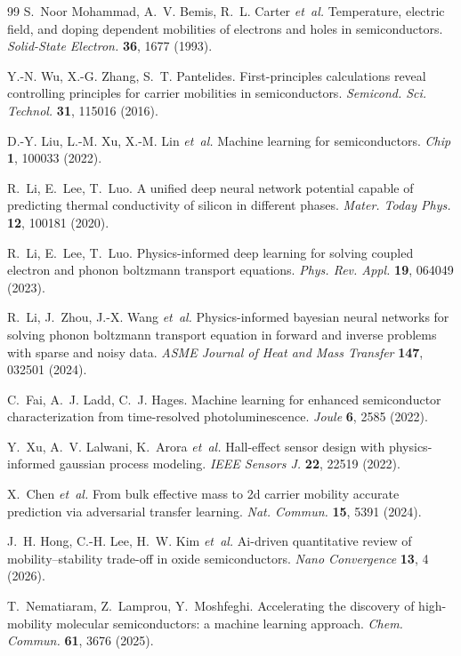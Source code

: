 \documentclass[fleqn,twoside,twocolumn,nofootinbib,showkeys]{revtex4} %
\begin{document}
\begin{thebibliography}{99}
S.~Noor Mohammad, A.~V. Bemis, R.~L. Carter \textit{et~al.} Temperature, electric field, and doping dependent mobilities of electrons and holes in semiconductors. \textit{Solid-State Electron.} \textbf{36}, 1677 (1993).

Y.-N. Wu, X.-G. Zhang, S.~T. Pantelides. First-principles calculations reveal controlling principles for carrier mobilities in semiconductors. \textit{Semicond. Sci. Technol.} \textbf{31}, 115016 (2016).

D.-Y. Liu, L.-M. Xu, X.-M. Lin \textit{et~al.} Machine learning for semiconductors. \textit{Chip} \textbf{1}, 100033 (2022).

R.~Li, E.~Lee, T.~Luo. A unified deep neural network potential capable of predicting thermal conductivity of silicon in different phases. \textit{Mater. Today Phys.} \textbf{12}, 100181 (2020).

R.~Li, E.~Lee, T.~Luo. Physics-informed deep learning for solving coupled electron and phonon boltzmann transport equations. \textit{Phys. Rev. Appl.} \textbf{19}, 064049 (2023).

R.~Li, J.~Zhou, J.-X. Wang \textit{et~al.} Physics-informed bayesian neural networks for solving phonon boltzmann transport equation in forward and inverse problems with sparse and noisy data. \textit{ASME Journal of Heat and Mass Transfer} \textbf{147}, 032501 (2024).

C.~Fai, A.~J. Ladd, C.~J. Hages. Machine learning for enhanced semiconductor characterization from time-resolved photoluminescence. \textit{Joule} \textbf{6}, 2585 (2022).

Y.~Xu, A.~V. Lalwani, K.~Arora \textit{et~al.} Hall-effect sensor design with physics-informed gaussian process modeling. \textit{IEEE Sensors J.} \textbf{22}, 22519 (2022).

X.~Chen \textit{et~al.} From bulk effective mass to 2d carrier mobility accurate prediction via adversarial transfer learning. \textit{Nat. Commun.} \textbf{15}, 5391 (2024).

J.~H. Hong, C.-H. Lee, H.~W. Kim \textit{et~al.} Ai-driven quantitative review of mobility--stability trade-off in oxide semiconductors. \textit{Nano Convergence} \textbf{13}, 4 (2026).

T.~Nematiaram, Z.~Lamprou, Y.~Moshfeghi. Accelerating the discovery of high-mobility molecular semiconductors: a machine learning approach. \textit{Chem. Commun.} \textbf{61}, 3676 (2025).


\end{thebibliography}
\end{document}
